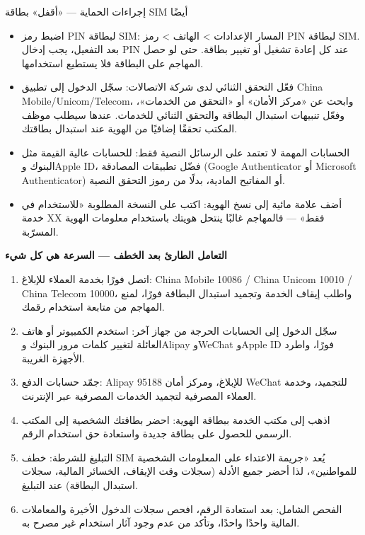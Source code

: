 \begin{tcbwarn}{إجراءات الحماية — «أقفل» بطاقة SIM أيضًا}
\begin{itemize}
  \item اضبط رمز PIN لبطاقة SIM: المسار الإعدادات > الهاتف > رمز PIN لبطاقة SIM. بعد التفعيل، يجب إدخال PIN عند كل إعادة تشغيل أو تغيير بطاقة. حتى لو حصل المهاجم على البطاقة فلا يستطيع استخدامها.
  \item فعّل التحقق الثنائي لدى شركة الاتصالات: سجّل الدخول إلى تطبيق China Mobile/Unicom/Telecom، وابحث عن «مركز الأمان» أو «التحقق من الخدمات»، وفعّل تنبيهات استبدال البطاقة والتحقق الثنائي للخدمات. عندها سيطلب موظف المكتب تحققًا إضافيًا من الهوية عند استبدال بطاقتك.
  \item الحسابات المهمة لا تعتمد على الرسائل النصية فقط: للحسابات عالية القيمة مثل البنوك وApple ID، فضّل تطبيقات المصادقة (Google Authenticator أو Microsoft Authenticator) أو المفاتيح المادية، بدلًا من رموز التحقق النصية.
  \item أضف علامة مائية إلى نسخ الهوية: اكتب على النسخة المطلوبة «للاستخدام في خدمة XX فقط» — فالمهاجم غالبًا ينتحل هويتك باستخدام معلومات الهوية المسرّبة.
\end{itemize}

\end{tcbwarn}

\textbf{التعامل الطارئ بعد الخطف — السرعة هي كل شيء}\par

\begin{enumerate}
  \item اتصل فورًا بخدمة العملاء للإبلاغ: China Mobile 10086 / China Unicom 10010 / China Telecom 10000، واطلب إيقاف الخدمة وتجميد استبدال البطاقة فورًا، لمنع المهاجم من متابعة استخدام رقمك.
  \item سجّل الدخول إلى الحسابات الحرجة من جهاز آخر: استخدم الكمبيوتر أو هاتف العائلة لتغيير كلمات مرور البنوك وAlipay وWeChat وApple ID فورًا، واطرد الأجهزة الغريبة.
  \item جمّد حسابات الدفع: Alipay 95188 للإبلاغ، ومركز أمان WeChat للتجميد، وخدمة العملاء المصرفية لتجميد الخدمات المصرفية عبر الإنترنت.
  \item اذهب إلى مكتب الخدمة ببطاقة الهوية: احضر بطاقتك الشخصية إلى المكتب الرسمي للحصول على بطاقة جديدة واستعادة حق استخدام الرقم.
  \item التبليغ للشرطة: خطف SIM يُعد «جريمة الاعتداء على المعلومات الشخصية للمواطنين»، لذا أحضر جميع الأدلة (سجلات وقت الإيقاف، الخسائر المالية، سجلات استبدال البطاقة) عند التبليغ.
  \item الفحص الشامل: بعد استعادة الرقم، افحص سجلات الدخول الأخيرة والمعاملات المالية واحدًا واحدًا، وتأكد من عدم وجود آثار استخدام غير مصرح به.
\end{enumerate}

